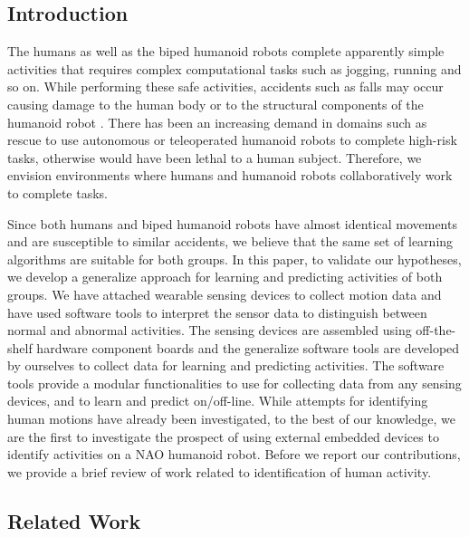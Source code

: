 \documentclass[letterpaper]{article}
\begin{document}
\begin{sloppy}
\section{Introduction}
\label{sec:Intro}
The humans as well as the biped humanoid robots complete apparently simple activities that requires 
complex computational tasks such as jogging, running and so on. While performing these safe 
activities, accidents such as falls may occur causing damage to the human body or to the structural 
components of the humanoid robot \cite{li2009accurate}. There has been an increasing demand in 
domains such as rescue to use autonomous or teleoperated humanoid robots to complete high-risk 
tasks, otherwise would have been lethal to a human subject. Therefore, we envision environments 
where humans and humanoid robots collaboratively work to complete tasks. 

Since both humans and biped humanoid robots have almost identical movements and are susceptible to 
similar accidents, we believe that the same set of learning algorithms are suitable for both 
groups. In this paper,  to validate our hypotheses, we develop a generalize approach for learning 
and predicting activities of both groups.  We have attached wearable sensing devices to collect 
motion data and have used software tools to interpret the sensor data to distinguish 
between normal and abnormal activities. The sensing devices are assembled using off-the-shelf 
hardware component boards and the generalize software tools are developed by ourselves to 
collect data for learning and predicting activities. The software tools provide a modular 
functionalities to use for collecting  data from any sensing devices, and to learn and predict 
on/off-line. While attempts for identifying human motions have already been investigated, to the 
best of our knowledge, we are the first to investigate the prospect of using external embedded 
devices to identify activities on a NAO humanoid robot. Before we report our contributions, we 
provide a brief review of work related to identification of human activity.  


\subsection{Related Work}


\end{sloppy}
\end{document}
